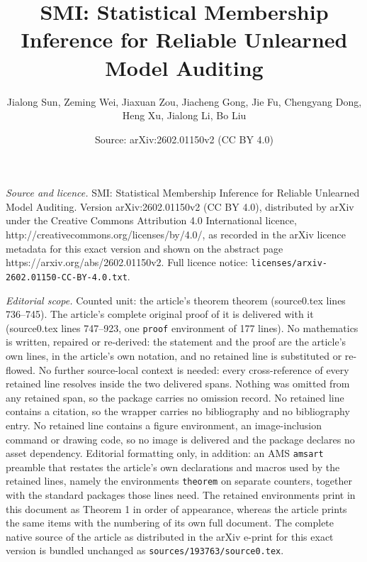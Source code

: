\documentclass[10pt,a4paper]{amsart}
\title{SMI: Statistical Membership Inference for Reliable Unlearned Model Auditing}
\author{Jialong Sun, Zeming Wei, Jiaxuan Zou, Jiacheng Gong, Jie Fu, Chengyang Dong, Heng Xu, Jialong Li, Bo Liu}
\date{Source: arXiv:2602.01150v2 (CC BY 4.0)}
\begin{document}
\maketitle

\noindent\emph{Source and licence.} SMI: Statistical Membership Inference for Reliable Unlearned Model Auditing. Version arXiv:2602.01150v2 (CC BY 4.0), distributed by arXiv under the Creative Commons Attribution 4.0 International licence, http://creativecommons.org/licenses/by/4.0/, as recorded in the arXiv licence metadata for this exact version and shown on the abstract page https://arxiv.org/abs/2602.01150v2. Full licence notice: \texttt{licenses/arxiv-2602.01150-CC-BY-4.0.txt}.\par\smallskip

\noindent\textit{Editorial scope.} Counted unit: the article's theorem theorem (source0.tex lines 736--745). The article's complete original proof of it is delivered with it (source0.tex lines 747--923, one \texttt{proof} environment of 177 lines). No mathematics is written, repaired or re-derived: the statement and the proof are the article's own lines, in the article's own notation, and no retained line is substituted or re-flowed.  No further source-local context is needed: every cross-reference of every retained line resolves inside the two delivered spans.  Nothing was omitted from any retained span, so the package carries no omission record.  No retained line contains a citation, so the wrapper carries no bibliography and no bibliography entry.  No retained line contains a figure environment, an image-inclusion command or drawing code, so no image is delivered and the package declares no asset dependency.  Editorial formatting only, in addition: an AMS \texttt{amsart} preamble that restates the article's own declarations and macros used by the retained lines, namely the environments \texttt{theorem} on separate counters, together with the standard packages those lines need.  The retained environments print in this document as Theorem 1 in order of appearance, whereas the article prints the same items with the numbering of its own full document.  The complete native source of the article as distributed in the arXiv e-print for this exact version is bundled unchanged as \texttt{sources/193763/source0.tex}.
\end{document}
